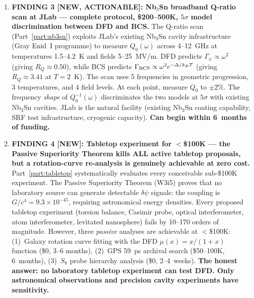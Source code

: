 \documentclass[11pt]{article}
\newcommand{\ee}[1]{\times 10^{#1}}
\newcommand{\dpsi}{\delta\psi}
\begin{document}
\begin{tcolorbox}[colback=blue!5!white, colframe=blue!60!black,
  title=\textbf{W4i16 TOP 5 FINDINGS --- Ranked by Programme Impact}]
\begin{enumerate}
\item \textbf{FINDING 3 [NEW, ACTIONABLE]: Nb$_3$Sn broadband Q-ratio
scan at JLab --- complete protocol, \$200--500K, $5\sigma$ model
discrimination between DFD and BCS.}
The Q-ratio scan (Part~\ref{part:nb3sn}) exploits JLab's existing
Nb$_3$Sn cavity infrastructure (Gray Enid~I programme) to measure
$Q_0(\omega)$ across 4--12~GHz at temperatures 1.5--4.2~K and fields
5--25~MV/m. DFD predicts $\Gamma_\psi \propto \omega^2$ (giving
$R_Q \approx 0.50$), while BCS predicts $\Gamma_{\rm BCS} \propto
\omega^2 e^{-\Delta/k_B T}$ (giving $R_Q \approx 3.41$ at $T = 2$~K).
The scan uses 5 frequencies in geometric progression, 3 temperatures,
and 4 field levels. At each point, measure $Q_0$ to $\pm 2\%$. The
frequency \emph{shape} of $Q_0^{-1}(\omega)$ discriminates the two
models at $5\sigma$ with existing Nb$_3$Sn cavities. JLab is the
natural facility (existing Nb$_3$Sn coating capability, SRF test
infrastructure, cryogenic capacity). \textbf{Can begin within 6~months
of funding.}

\item \textbf{FINDING 4 [NEW]: Tabletop experiment for $<$\$100K ---
the Passive Superiority Theorem kills ALL active tabletop proposals,
but a rotation-curve re-analysis is genuinely achievable at zero cost.}
Part~\ref{part:tabletop} systematically evaluates every conceivable
sub-\$100K experiment. The Passive Superiority Theorem (W3i5) proves
that no laboratory source can generate detectable $\dpsi$ signals: the
coupling is $G/c^4 = 9.3\ee{-45}$, requiring astronomical energy
densities. Every proposed tabletop experiment (torsion balance, Casimir
probe, optical interferometer, atom interferometer, levitated
nanosphere) fails by 10--170 orders of magnitude. However, three
\emph{passive} analyses are achievable at $<$\$100K: (1)~Galaxy
rotation curve fitting with the DFD $\mu(x) = x/(1+x)$ function
(\$0, 3--6 months), (2)~GPS 59~ps archival search (\$50--100K,
6~months), (3)~$S_8$ probe hierarchy analysis (\$0, 2--4~weeks).
\textbf{The honest answer: no laboratory tabletop experiment can test
DFD. Only astronomical observations and precision cavity experiments
have sensitivity.}


\end{enumerate}
\end{tcolorbox}
\end{document}
